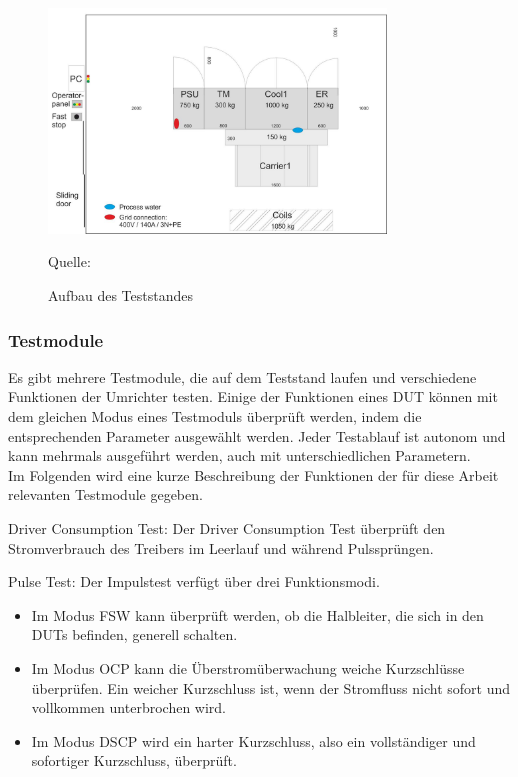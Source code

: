 \begin{figure}[h]
    \centering
    \includegraphics[width=0.8\textwidth]{Grafiken/Test Cabin}
    \caption{Aufbau des Teststandes}
    \label{fig: Aufbau des Teststandes}
    {Quelle: \cite*[7]{Main_Manuel_USTB2018}}
\end{figure}
\subsubsection{Testmodule}
Es gibt mehrere Testmodule, die auf dem Teststand laufen und verschiedene Funktionen der Umrichter testen.
Einige der Funktionen eines DUT können mit dem gleichen Modus eines Testmoduls überprüft werden, indem die entsprechenden Parameter ausgewählt werden.
Jeder Testablauf ist autonom und kann mehrmals ausgeführt werden, auch mit unterschiedlichen Parametern.
\\
Im Folgenden wird eine kurze Beschreibung der Funktionen der für diese Arbeit relevanten Testmodule gegeben.

Driver Consumption Test:
Der Driver Consumption Test überprüft den Stromverbrauch des Treibers im Leerlauf und während Pulssprüngen.

Pulse Test:
Der Impulstest verfügt über drei Funktionsmodi.
\begin{itemize}
    \item Im Modus \ac{FSW} kann überprüft werden, ob die Halbleiter, die sich in den \ac{DUTs} befinden, generell schalten.
    \item Im Modus \ac{OCP} kann die Überstromüberwachung weiche Kurzschlüsse überprüfen.
    Ein weicher Kurzschluss ist, wenn der Stromfluss nicht sofort und vollkommen unterbrochen wird.
    \item Im Modus \ac{DSCP} wird ein harter Kurzschluss, also ein vollständiger und sofortiger Kurzschluss, überprüft.
\end{itemize}


